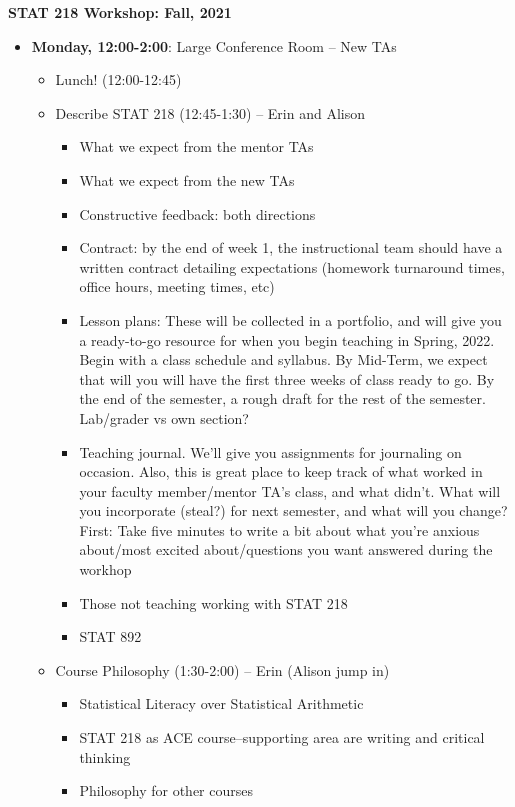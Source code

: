 \documentclass{article}
\begin{document}
\begin{center}
{\large \textbf{STAT 218 Workshop:  Fall, 2021}}
\end{center}

\begin{itemize}
\item \textbf{Monday, 12:00-2:00}:  Large Conference Room -- New TAs
\begin{itemize}
\item Lunch! (12:00-12:45)
\item Describe STAT 218 (12:45-1:30) -- Erin and Alison
\begin{itemize}
\item What we expect from the mentor TAs
\item What we expect from the new TAs
\item Constructive feedback:  both directions
\item Contract:  by the end of week 1, the instructional team should have a written contract detailing expectations (homework turnaround times, office hours, meeting times, etc)
\item Lesson plans: These will be collected in a portfolio, and will give you a ready-to-go resource for when you begin teaching in Spring, 2022.  Begin with a class schedule and syllabus.  By Mid-Term, we expect that will you will have the first three weeks of class ready to go.  By the end of the semester, a rough draft for the rest of the semester. Lab/grader vs own section?
\item Teaching journal.  We'll give you assignments for journaling on occasion.  Also, this is great place to keep track of what worked in your faculty member/mentor TA's class, and what didn't.  What will you incorporate (steal?) for next semester, and what will you change?  First:  Take five minutes to write a bit about what you're anxious about/most excited about/questions you want answered during the workhop
\item Those not teaching working with STAT 218
\item STAT 892
\end{itemize}
\item Course Philosophy (1:30-2:00) -- Erin (Alison jump in)
\begin{itemize}
\item Statistical Literacy over Statistical Arithmetic
\item STAT 218 as ACE course--supporting area are writing and critical thinking
\item Philosophy for other courses

\end{itemize}
\end{itemize}
\end{itemize}
\end{document}
